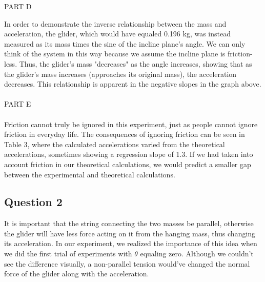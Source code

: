 \documentclass [12pt, letterpaper, twoside] {article}
\begin{document}
\noindent
PART D \\

\begin{figure}[h!]
  \centering
\end{figure}
 
\noindent
In order to demonstrate the inverse relationship between the mass and acceleration, the glider, which would have equaled 0.196 kg, was instead measured as its mass times the sine of the incline plane's angle. We can only think of the system in this way because we assume the incline plane is friction-less. Thus, the glider's mass "decreases" as the angle increases, showing that as the glider's mass increases (approaches its original mass), the acceleration decreases. This relationship is apparent in the negative slopes in the graph above. \\\\

\noindent
PART E \\\\
Friction cannot truly be ignored in this experiment, just as people cannot ignore friction in everyday life. The consequences of ignoring friction can be seen in Table 3, where the calculated accelerations varied from the theoretical accelerations, sometimes showing a regression slope of 1.3. If we had taken into account friction in our theoretical calculations, we would predict a smaller gap between the experimental and theoretical calculations.

\subsection*{Question 2}
  It is important that the string connecting the two masses be parallel, otherwise the glider will have less force acting on it from the hanging mass, thus changing its acceleration. In our experiment, we realized the importance of this idea when we did the first trial of experiments with \(\theta\) equaling zero. Although we couldn't see the difference visually, a non-parallel tension would've changed the normal force of the glider along with the acceleration. \\
\end{document}
